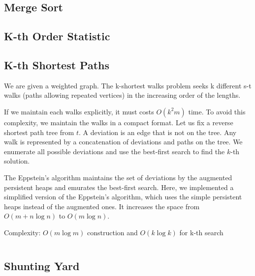 \subsection{Merge Sort}
\subsection{K-th Order Statistic}
\subsection{K-th Shortest Paths}

We are given a weighted graph. The k-shortest walks problem
seeks k different s-t walks (paths allowing repeated vertices)
in the increasing order of the lengths.

If we maintain each walks explicitly, it must costs $O(k^2 m)$ time.
To avoid this complexity, we maintain the walks in a compact format.
Let us fix a reverse shortest path tree from $t$. A deviation is an 
edge that is not on the tree. Any walk is represented by a concatenation
of deviations and paths on the tree. We enumerate all possible 
deviations and use the best-first search to find the $k$-th solution.

The Eppstein's algorithm maintains the set of deviations by 
the augmented persistent heaps and emurates the best-first search. 
Here, we implemented a simplified version of the Eppstein's algorithm,
which uses the simple persistent heaps instead of the augmented ones.
It increases the space from $O(m + n \log n)$ to $O(m \log n)$. \cite{Eppstein}

Complexity: $O(m \log m)$ construction and $O(k \log k)$ for k-th search

\hrulefill \vspace{-\baselineskip}
\begin{multicols}{2}
\inputminted[autogobble,fontsize=\tiny]{C++}{Algorithms/kth_shortest_path.cpp}
\end{multicols}
\vspace{-\baselineskip}
\noindent \hrulefill

\subsection{Shunting Yard}

\hrulefill \vspace{-\baselineskip}
\begin{multicols}{2}
\inputminted[autogobble,fontsize=\tiny]{C++}{Algorithms/shunting_yard.cpp}
\end{multicols}
\vspace{-\baselineskip}
\noindent \hrulefill